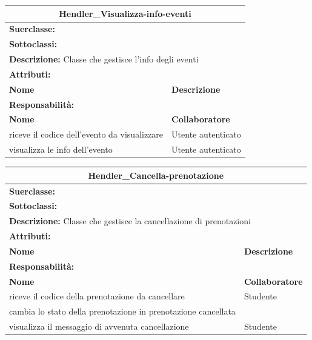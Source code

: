 \documentclass[11pt]{article}
\begin{document}
\begin{table}[H]
\centering
\begin{tabularx}{1\textwidth}{|X|X|}\hline
\multicolumn{2}{|c|}{\textbf{Hendler\_Visualizza-info-eventi}}\\\hline
\multicolumn{2}{|l|}{\textbf{Suerclasse:}}\\\hline
\multicolumn{2}{|l|}{\textbf{Sottoclassi:}}\\\hline
\multicolumn{2}{|l|}{\textbf{Descrizione:} Classe che gestisce l'info degli eventi}\\\hline
\multicolumn{2}{|l|}{\textbf{Attributi:}}\\
\textbf{Nome} & \textbf{Descrizione}\\
\hline
\multicolumn{2}{|l|}{\textbf{Responsabilità:}}\\
\textbf{Nome} & \textbf{Collaboratore}\\
riceve il codice dell'evento da visualizzare & Utente autenticato\\
visualizza le info dell'evento & Utente autenticato\\
\hline
\end{tabularx}
\end{table}


\begin{table}[H]
\centering
\begin{tabularx}{1\textwidth}{|X|X|}\hline
\multicolumn{2}{|c|}{\textbf{Hendler\_Cancella-prenotazione}}\\\hline
\multicolumn{2}{|l|}{\textbf{Suerclasse:}}\\\hline
\multicolumn{2}{|l|}{\textbf{Sottoclassi:}}\\\hline
\multicolumn{2}{|l|}{\textbf{Descrizione:} Classe che gestisce la cancellazione di prenotazioni}\\\hline
\multicolumn{2}{|l|}{\textbf{Attributi:}}\\
\textbf{Nome} & \textbf{Descrizione}\\
\hline
\multicolumn{2}{|l|}{\textbf{Responsabilità:}}\\
\textbf{Nome} & \textbf{Collaboratore}\\
riceve il codice della prenotazione da cancellare & Studente\\
cambia lo stato della prenotazione in prenotazione cancellata &\\
visualizza il messaggio di avvenuta cancellazione & Studente\\
\hline
\end{tabularx}
\end{table}
\end{document}
